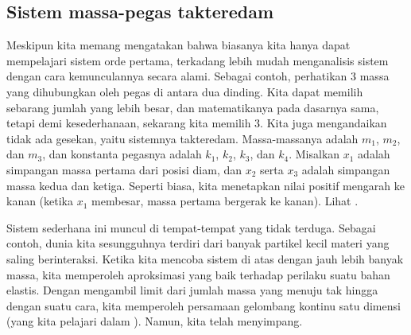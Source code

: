 \subsection{Sistem massa-pegas takteredam}

Meskipun kita memang mengatakan bahwa biasanya kita hanya dapat mempelajari sistem orde pertama, terkadang
lebih mudah menganalisis sistem dengan cara kemunculannya secara alami.
Sebagai contoh, perhatikan 3 massa yang dihubungkan oleh pegas di antara dua
dinding.  Kita dapat memilih sebarang jumlah yang lebih besar, dan matematikanya pada dasarnya
sama, tetapi demi kesederhanaan, sekarang kita memilih 3.  Kita juga mengandaikan tidak ada
gesekan, yaitu sistemnya takteredam.
Massa-massanya adalah $m_1$, $m_2$, dan
$m_3$, dan konstanta pegasnya adalah $k_1$, $k_2$, $k_3$, dan $k_4$.
Misalkan $x_1$ adalah simpangan massa pertama dari posisi diam, dan
$x_2$ serta $x_3$ adalah simpangan massa kedua dan ketiga.  Seperti
biasa, kita menetapkan nilai positif mengarah ke kanan (ketika $x_1$ membesar, massa pertama
bergerak ke kanan).
Lihat .

\begin{myfig}
\capstart
{}
\caption{Sistem massa dan pegas.\label{sosa:threecartsfig}}
\end{myfig}

Sistem sederhana ini muncul di tempat-tempat yang tidak terduga.  Sebagai contoh, 
dunia kita sesungguhnya terdiri dari banyak partikel kecil materi yang saling berinteraksi.
Ketika kita mencoba sistem di atas dengan jauh lebih banyak massa, kita memperoleh aproksimasi yang baik terhadap
perilaku suatu bahan elastis.  Dengan mengambil limit dari
jumlah massa yang menuju tak hingga dengan suatu cara, kita memperoleh persamaan gelombang kontinu
satu dimensi (yang kita pelajari dalam ).
Namun, kita telah menyimpang.

